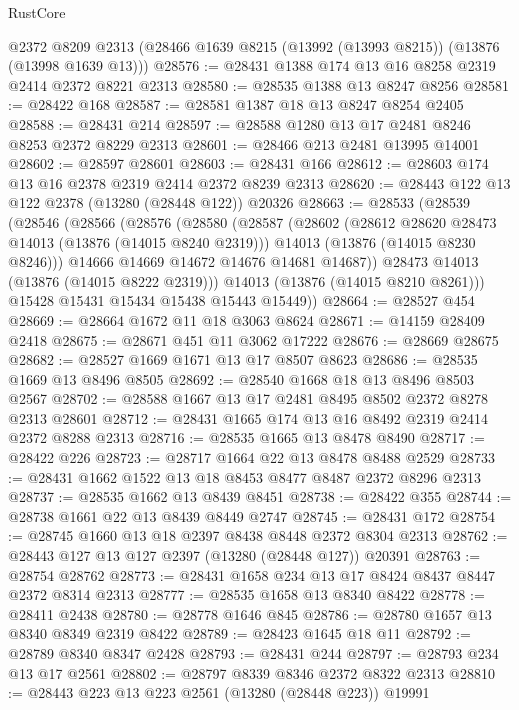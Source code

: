 \begin{lexlean}{RustCore}
\begin{coremodule}
    @2372
    @8209
    @2313
    (@28466 @1639 @8215 (@13992 (@13993 @8215)) (@13876 (@13998 @1639 @13)))
@28576 := @28431 @1388 @174 @13 @16 @8258 @2319 @2414 @2372 @8221 @2313
@28580 := @28535 @1388 @13 @8247 @8256
@28581 := @28422 @168
@28587 := @28581 @1387 @18 @13 @8247 @8254 @2405
@28588 := @28431 @214
@28597 := @28588 @1280 @13 @17 @2481 @8246 @8253 @2372 @8229 @2313
@28601 := @28466 @213 @2481 @13995 @14001
@28602 := @28597 @28601
@28603 := @28431 @166
@28612 := @28603 @174 @13 @16 @2378 @2319 @2414 @2372 @8239 @2313
@28620 := @28443 @122 @13 @122 @2378 (@13280 (@28448 @122)) @20326
@28663 := @28533
    (@28539
      (@28546
        (@28566
          (@28576
            (@28580
              (@28587
                (@28602
                  (@28612 @28620 @28473 @14013 (@13876 (@14015 @8240 @2319)))
                  @14013
                  (@13876 (@14015 @8230 @8246)))
                @14666
                @14669
                @14672
                @14676
                @14681
                @14687))
            @28473
            @14013
            (@13876 (@14015 @8222 @2319)))
          @14013
          (@13876 (@14015 @8210 @8261)))
        @15428
        @15431
        @15434
        @15438
        @15443
        @15449))
@28664 := @28527 @454
@28669 := @28664 @1672 @11 @18 @3063 @8624
@28671 := @14159 @28409 @2418
@28675 := @28671 @451 @11 @3062 @17222
@28676 := @28669 @28675
@28682 := @28527 @1669 @1671 @13 @17 @8507 @8623
@28686 := @28535 @1669 @13 @8496 @8505
@28692 := @28540 @1668 @18 @13 @8496 @8503 @2567
@28702 := @28588 @1667 @13 @17 @2481 @8495 @8502 @2372 @8278 @2313 @28601
@28712 := @28431 @1665 @174 @13 @16 @8492 @2319 @2414 @2372 @8288 @2313
@28716 := @28535 @1665 @13 @8478 @8490
@28717 := @28422 @226
@28723 := @28717 @1664 @22 @13 @8478 @8488 @2529
@28733 := @28431 @1662 @1522 @13 @18 @8453 @8477 @8487 @2372 @8296 @2313
@28737 := @28535 @1662 @13 @8439 @8451
@28738 := @28422 @355
@28744 := @28738 @1661 @22 @13 @8439 @8449 @2747
@28745 := @28431 @172
@28754 := @28745 @1660 @13 @18 @2397 @8438 @8448 @2372 @8304 @2313
@28762 := @28443 @127 @13 @127 @2397 (@13280 (@28448 @127)) @20391
@28763 := @28754 @28762
@28773 := @28431 @1658 @234 @13 @17 @8424 @8437 @8447 @2372 @8314 @2313
@28777 := @28535 @1658 @13 @8340 @8422
@28778 := @28411 @2438
@28780 := @28778 @1646 @845
@28786 := @28780 @1657 @13 @8340 @8349 @2319 @8422
@28789 := @28423 @1645 @18 @11
@28792 := @28789 @8340 @8347 @2428
@28793 := @28431 @244
@28797 := @28793 @234 @13 @17 @2561
@28802 := @28797 @8339 @8346 @2372 @8322 @2313
@28810 := @28443 @223 @13 @223 @2561 (@13280 (@28448 @223)) @19991

\end{coremodule}
\end{lexlean}
